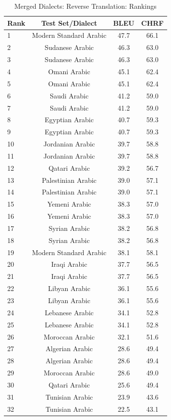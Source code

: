 \begin{table}[htbp]
\centering
\caption{Merged Dialects: Reverse Translation: Rankings}
\label{tab:testset_ranking_reverse_merged}
\begin{tabular}{l@{\hspace{3pt}}c@{\hspace{3pt}}c@{\hspace{3pt}}c}
\toprule
Rank & Test Set/Dialect & BLEU & CHRF \\
\midrule
1 & Modern Standard Arabic  & 47.7 & 66.1 \\
2 & Sudanese Arabic & 46.3 & 63.0 \\
3 & Sudanese Arabic  & 46.3 & 63.0 \\
4 & Omani Arabic & 45.1 & 62.4 \\
5 & Omani Arabic  & 45.1 & 62.4 \\
6 & Saudi Arabic & 41.2 & 59.0 \\
7 & Saudi Arabic  & 41.2 & 59.0 \\
8 & Egyptian Arabic & 40.7 & 59.3 \\
9 & Egyptian Arabic  & 40.7 & 59.3 \\
10 & Jordanian Arabic & 39.7 & 58.8 \\
11 & Jordanian Arabic  & 39.7 & 58.8 \\
12 & Qatari Arabic  & 39.2 & 56.7 \\
13 & Palestinian Arabic & 39.0 & 57.1 \\
14 & Palestinian Arabic  & 39.0 & 57.1 \\
15 & Yemeni Arabic & 38.3 & 57.0 \\
16 & Yemeni Arabic  & 38.3 & 57.0 \\
17 & Syrian Arabic & 38.2 & 56.8 \\
18 & Syrian Arabic  & 38.2 & 56.8 \\
19 & Modern Standard Arabic & 38.1 & 58.1 \\
20 & Iraqi Arabic & 37.7 & 56.5 \\
21 & Iraqi Arabic  & 37.7 & 56.5 \\
22 & Libyan Arabic & 36.1 & 55.6 \\
23 & Libyan Arabic  & 36.1 & 55.6 \\
24 & Lebanese Arabic & 34.1 & 52.8 \\
25 & Lebanese Arabic  & 34.1 & 52.8 \\
26 & Moroccan Arabic  & 32.1 & 51.6 \\
27 & Algerian Arabic & 28.6 & 49.4 \\
28 & Algerian Arabic  & 28.6 & 49.4 \\
29 & Moroccan Arabic & 28.6 & 49.0 \\
30 & Qatari Arabic & 25.6 & 49.4 \\
31 & Tunisian Arabic  & 23.9 & 43.6 \\
32 & Tunisian Arabic & 22.5 & 43.1 \\
\bottomrule
\end{tabular}
\end{table}